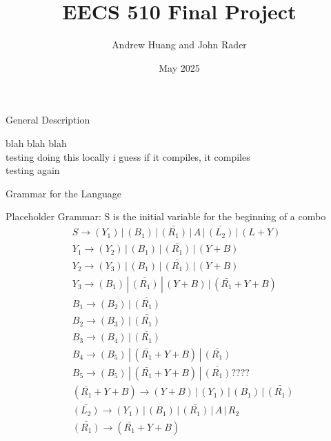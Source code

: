 \documentclass{article}
\title{EECS 510 Final Project}
\author{Andrew Huang and John Rader}
\date{May 2025}
\begin{document}
\maketitle


\begin{mylist}

\item General Description

blah blah blah \\
testing doing this locally i guess if it compiles, it compiles \\
testing again

\item Grammar for the Language

Placeholder Grammar:
S is the initial variable for the beginning of a combo
\begin{align*}
&S \rightarrow (Y_1) \, | \, (B_1) \, | \, \bar{(R_1)} \, | \, A \, | \, \bar{(L_2)} \, | \, (L+Y)\\
&Y_1 \rightarrow (Y_2) \, | \, (B_1) \, | \, \bar{(R_1)} \, | \, (Y+B) \\
&Y_2 \rightarrow (Y_3) \, | \, (B_1) \, | \, \bar{(R_1)} \, | \, (Y+B) \\
&Y_3 \rightarrow (B_1) \, | \, \bar{(R_1)}  \, | \, (Y+B) \, | \, (\bar{R_1}+Y+B) \\
&B_1 \rightarrow (B_2) \, | \, \bar{(R_1)} \\ 
&B_2 \rightarrow (B_3) \, | \, \bar{(R_1)} \\ 
&B_3 \rightarrow (B_4) \, | \, \bar{(R_1)} \\ 
&B_4 \rightarrow (B_5) \, | \, (\bar{R_1}+Y+B) \, | \, \bar{(R_1)} \\ 
&B_5 \rightarrow (B_5) \, | \, (\bar{R_1}+Y+B) \, | \, \bar{(R_1)} ????\\ 
&(\bar{R_1}+Y+B) \rightarrow (Y+B) \, | \, (Y_1) \, | \, (B_1) \, | \, \bar{(R_1)} \\
&\bar{(L_2)} \rightarrow (Y_1) \, | \, (B_1) \, | \, \bar{(R_1)} \, | \, A \, | \, R_2 \\
&\bar{(R_1)} \rightarrow (\bar{R_1}+Y+B) \\ 
\end{align*}


\end{mylist}
\end{document}
